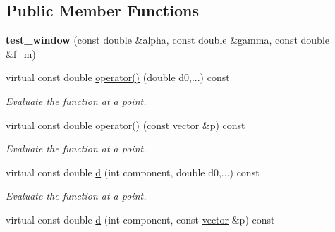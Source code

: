 \subsection*{Public Member Functions}
\begin{DoxyCompactItemize}
\item 
\mbox{\label{classsisl_1_1test_1_1test__window_a814750884074212b92bc6e48af1b1c56}} 
{\bfseries test\+\_\+window} (const double \&alpha, const double \&gamma, const double \&f\+\_\+m)
\item 
\mbox{\label{classsisl_1_1test_1_1test__window_a1e5ba236c8a98eda588fe418c5c44059}} 
virtual const double \hyperlink{classsisl_1_1test_1_1test__window_a1e5ba236c8a98eda588fe418c5c44059}{operator()} (double d0,...) const
\begin{DoxyCompactList}\small\item\em Evaluate the function at a point. \end{DoxyCompactList}\item 
\mbox{\label{classsisl_1_1test_1_1test__window_a136fcec74e082b51603ec34d5aecb97d}} 
virtual const double \hyperlink{classsisl_1_1test_1_1test__window_a136fcec74e082b51603ec34d5aecb97d}{operator()} (const \hyperlink{namespacesisl_a2069bd5374a9be042ff3ce3306d41e1a}{vector} \&p) const
\begin{DoxyCompactList}\small\item\em Evaluate the function at a point. \end{DoxyCompactList}\item 
\mbox{\label{classsisl_1_1test_1_1test__window_a905de724a7fd4384e79788bb32443f6c}} 
virtual const double \hyperlink{classsisl_1_1test_1_1test__window_a905de724a7fd4384e79788bb32443f6c}{d} (int component, double d0,...) const
\begin{DoxyCompactList}\small\item\em Evaluate the function at a point. \end{DoxyCompactList}\item 
\mbox{\label{classsisl_1_1test_1_1test__window_af3d49aef2f190524c2537731bdbeb1ea}} 
virtual const double \hyperlink{classsisl_1_1test_1_1test__window_af3d49aef2f190524c2537731bdbeb1ea}{d} (int component, const \hyperlink{namespacesisl_a2069bd5374a9be042ff3ce3306d41e1a}{vector} \&p) const

\end{DoxyCompactItemize}
